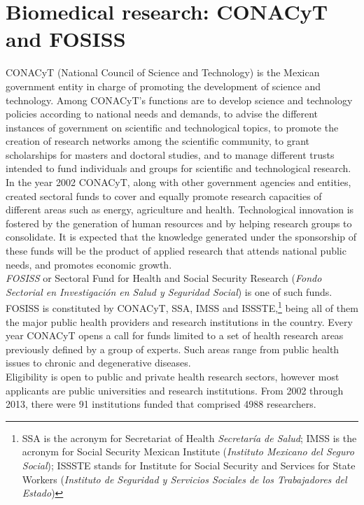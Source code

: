 \documentclass[11pt]{article}
\begin{document}
\section{Biomedical research: CONACyT and FOSISS}
\label{sec:1}

CONACyT (National Council of Science and Technology) is the Mexican government
entity in charge of promoting the development of science and 
technology.
Among CONACyT's functions are to develop science and technology
policies according to national needs and demands, to advise the different
instances of government on scientific and technological topics, to promote the
creation of research networks among the scientific community, to grant
scholarships for masters and doctoral studies, and to manage different trusts 
intended to fund individuals and groups for scientific and
technological research.\\

In the year 2002 CONACyT, along with other government agencies and
entities, created sectoral funds
to cover and equally
promote research capacities of different areas such as energy, agriculture
and health. Technological innovation is fostered by the generation of human resources
and by helping research groups to consolidate. It is expected that the
knowledge generated under the sponsorship of these funds
will be the product of applied research that attends national public
needs, and promotes economic growth.\\

\emph{FOSISS} or Sectoral Fund for Health and Social Security Research
(\emph{Fondo Sectorial en Investigaci\'on en Salud y Seguridad Social}) is one of
such funds. FOSISS is constituted by CONACyT, SSA, IMSS and ISSSTE,\footnote{SSA
  is the acronym for Secretariat of Health \emph{Secretar\'ia de Salud}; IMSS is
  the acronym for Social Security Mexican Institute (\emph{Instituto Mexicano
    del Seguro Social}); ISSSTE stands for Institute for Social Security and
  Services for State Workers (\emph{Instituto de Seguridad y Servicios Sociales
    de los Trabajadores del Estado})} being all of them the major public health
providers and research institutions in the country. Every year CONACyT opens a
call for funds limited to a set of health research areas previously defined by a
group of experts. Such areas range from public health issues to chronic and
degenerative diseases.\\  

Eligibility is open to public and private health research sectors,
however most applicants are public universities and research
institutions. From 2002 through 2013, there were 91 institutions funded that
comprised 4988 researchers.\\ 
\end{document}
